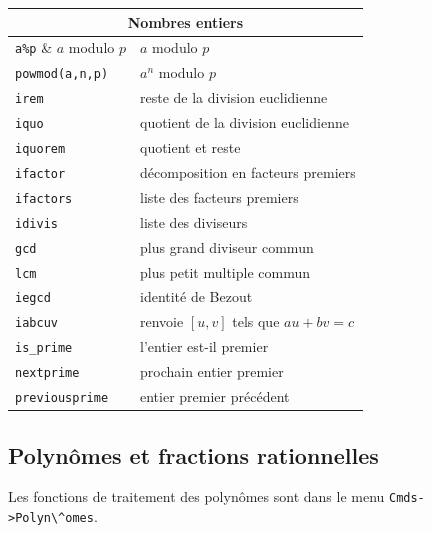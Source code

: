 \documentclass{article}
\begin{document}
\begin{center}
\begin{tabular}{|ll|}
\hline
\multicolumn{2}{|c|}{\bf Nombres entiers}\\
\hline\hline
\verb|a%p| & $a$ modulo $p$\\
\verb|powmod(a,n,p)| & $a^n$ modulo $p$\\
\verb|irem| &reste de la division euclidienne\\
\verb|iquo| &quotient de la division euclidienne\\
\verb|iquorem| &quotient et reste\\
\hline
\verb|ifactor| & d\'ecomposition en facteurs premiers\\
\verb|ifactors| & liste des facteurs premiers\\
\verb|idivis| & liste des diviseurs\\
\hline
\verb|gcd| & plus grand diviseur commun\\
\verb|lcm| & plus petit multiple commun\\
\verb|iegcd| & identit\'e de Bezout\\
\verb|iabcuv| & renvoie $[u,v]$ tels que $au+bv=c$\\
\hline
\verb|is_prime| & l'entier est-il premier\\
\verb|nextprime| & prochain entier premier\\
\verb|previousprime| & entier premier pr\'ec\'edent\\
\hline
\end{tabular}
\end{center}
%
\subsection{Polyn\^omes et fractions rationnelles}
%
Les fonctions de traitement des polyn\^omes sont dans le menu 
\verb|Cmds->Polyn\^omes|. 
\end{document}
